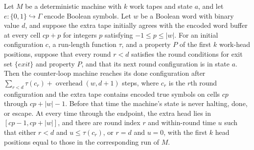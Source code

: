 \begin{theorem}
\label{Turing.counterLoopTMVia_done_witness}
\leanok
{}
Let $M$ be a deterministic machine with $k$ work tapes and state $a$, and let
$e:\{0,1\}\hookrightarrow\Gamma$ encode Boolean symbols. Let $w$ be a Boolean word
with binary value $d$, and suppose the extra tape initially agrees with the encoded word
buffer at every cell $cp+p$ for integers $p$ satisfying $-1\le p\le |w|$. For an
initial configuration $c$, a run-length function $\tau$, and a property $P$ of the
first $k$ work-head positions, suppose that every round $r<d$ satisfies the round
conditions for exit set $\{exit\}$ and property $P$, and that its next round
configuration is in state $a$. Then the counter-loop machine reaches its done
configuration after $\sum_{r<d}\tau(c_r)+\operatorname{overhead}(w,d+1)$ steps, where
$c_r$ is the $r$th round configuration and the extra tape contains encoded true symbols
on cells $cp$ through $cp+|w|-1$. Before that time the machine's state is never halting,
done, or escape. At every time through the endpoint, the extra head lies in
$[cp-1,cp+|w|]$, and there are round index $r$ and within-round time $u$ such that
either $r<d$ and $u\le\tau(c_r)$, or $r=d$ and $u=0$, with the first $k$ head
positions equal to those in the corresponding run of $M$.
\end{theorem}


